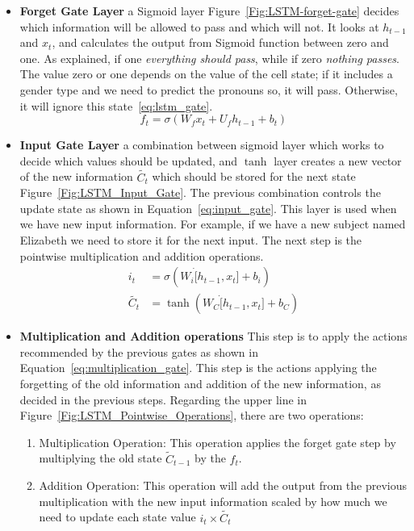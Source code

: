 \begin{itemize}
 
\item \textbf{Forget Gate Layer} a Sigmoid layer Figure~\ref{Fig:LSTM-forget-gate} decides which information will be allowed to pass and which will not. It looks at $h_{t-1}$ and $x_t$, and calculates the output from Sigmoid function between zero and one. As explained, if one \textit{everything should pass}, while if zero \textit{nothing passes}. The value zero or one depends on the value of the cell state; if it includes a gender type and we need to predict the pronouns so, it will pass. Otherwise, it will ignore this state~\eqref{eq:lstm_gate}.%
\begin{equation}\label{eq:lstm_gate}
f_t = \sigma(W_f x_t + U_f h_{t-1} + b_t)
\end{equation}%

\item \textbf{Input Gate Layer} a combination between sigmoid layer which works to decide which values should be updated, and $\tanh$ layer creates a new vector of the new information $\tilde{C_t}$ which should be stored for the next state Figure~\ref{Fig:LSTM_Input_Gate}. The previous combination controls the update state as shown in Equation~\eqref{eq:input_gate}. This layer is used when we have new input information. For example, if we have a new subject named Elizabeth we need to store it for the next input. The next step is the pointwise multiplication and addition operations.%
\begin{subequations}\label{eq:input_gate}
\begin{align}
 i_t &= \sigma(W_i \dot[h_{t-1},x_t] + b_i)\\
\widetilde{C_t} &= \tanh(W_C\dot [h_{t-1},x_t]+ b_C)
\end{align}
\end{subequations}

\item \textbf{Multiplication and Addition operations} This step is to apply the actions recommended by the previous gates as shown in Equation~\eqref{eq:multiplication_gate}. This step is the actions applying the forgetting of the old information and addition of the new information, as decided in the previous steps. Regarding the upper line in Figure~\ref{Fig:LSTM_Pointwise_Operations}, there are two operations:
\begin{enumerate}
\item Multiplication Operation: This operation applies the forget gate step by multiplying the old state $\tilde{C}_{t-1} $ by the $f_t$.
\item Addition Operation: This operation will add the output from the previous multiplication with the new input information scaled by how much we need to update each state value $i_t \times \tilde{C_t}$
\end{enumerate}%
 

\end{itemize}
